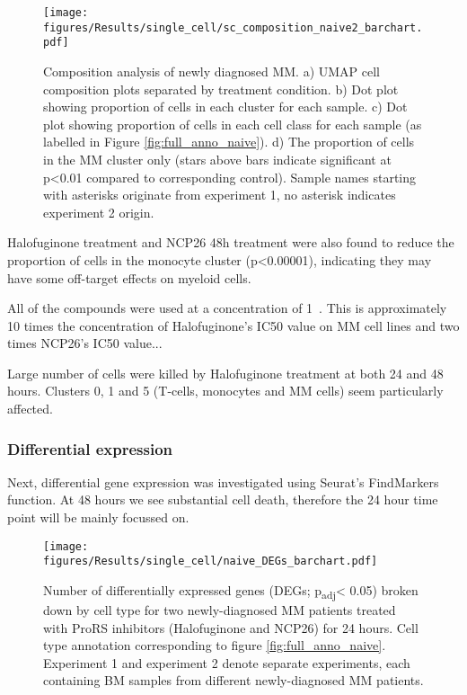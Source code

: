 \begin{figure}[htb]
\centering
\texttt{[image: figures/Results/single\_cell/sc\_composition\_naive2\_barchart.pdf]}
\caption[scRNA-seq composition analysis- newly diagnosed MM]{Composition analysis of newly diagnosed MM.
    a) UMAP cell composition plots separated by treatment condition.
    b) Dot plot showing proportion of cells in each cluster for each sample.
    c) Dot plot showing proportion of cells in each cell class for each sample (as labelled in Figure \ref{fig:full_anno_naive}).
    d) The proportion of cells in the MM cluster only (stars above bars indicate significant at p<0.01 compared to corresponding control).
    Sample names starting with asterisks originate from experiment 1, no asterisk indicates experiment 2 origin.}
\label{fig:composition_naive}
\end{figure}

Halofuginone treatment and NCP26 48h treatment were also found to reduce the proportion of cells in the monocyte cluster (p<0.00001), indicating they may have some off-target effects on myeloid cells.

All of the compounds were used at a concentration of 1\si{\micro\Molar}.
This is approximately 10 times the concentration of Halofuginone's IC50 value on MM cell lines and two times NCP26's IC50 value...

Large number of cells were killed by Halofuginone treatment at both 24 and 48 hours.
Clusters 0, 1 and 5 (T-cells, monocytes and MM cells) seem particularly affected.

\subsubsection{Differential expression}
Next, differential gene expression was investigated using Seurat's FindMarkers function.
At 48 hours we see substantial cell death, therefore the 24 hour time point will be mainly focussed on.
%
\begin{figure}[htb]
\centering
\texttt{[image: figures/Results/single\_cell/naive\_DEGs\_barchart.pdf]}
\caption[scRNA-seq DEGs per cell type- newly-diagnosed MM]{Number of differentially expressed genes (DEGs; p\textsubscript{adj}< 0.05) broken down by cell type for two newly-diagnosed MM patients treated with ProRS inhibitors (Halofuginone and NCP26) for 24 hours.
Cell type annotation corresponding to figure \ref{fig:full_anno_naive}.
Experiment 1 and experiment 2 denote separate experiments, each containing BM samples from different newly-diagnosed MM patients.}
\label{fig:naive_deg_bar}
\end{figure}

